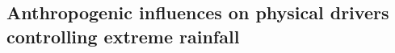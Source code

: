 \documentclass[
11pt,notheorems,hyperref={pdfauthor=whatever}
]{beamer}
\begin{document}

\subsection{Anthropogenic influences on \textbf{physical drivers} controlling extreme rainfall}

\end{document}
